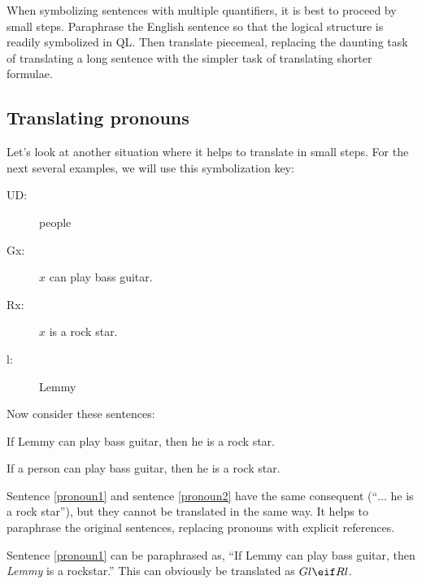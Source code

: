 When symbolizing sentences with multiple quantifiers, it is best to proceed by small steps. Paraphrase the English sentence so that the logical structure is readily symbolized in QL. Then translate piecemeal, replacing the daunting task of translating a long sentence with the simpler task of translating shorter formulae.

\subsection{Translating pronouns}

Let's look at another situation where it helps to translate in small steps. For the next several examples, we will use this symbolization key:

\begin{description}
\item[UD:] people
\item[Gx:] $x$ can play bass guitar.
\item[Rx:] $x$ is a rock star.
\item[l:] Lemmy
\end{description}

Now consider these sentences:

\begin{kormanize}
\item[\ex{pronoun1}] If Lemmy can play bass guitar, then he is a rock star.
\item[\ex{pronoun2}] If a person can play bass guitar, then he is a rock star.
\end{kormanize}


Sentence \ref{pronoun1} and sentence \ref{pronoun2} have the same consequent (``$\ldots$ he is a rock star''), but they cannot be translated in the same way. It helps to paraphrase the original sentences, replacing pronouns with explicit references.

Sentence \ref{pronoun1} can be paraphrased as, ``If Lemmy can play bass guitar, then \emph{Lemmy} is a rockstar.'' This can obviously be translated as $Gl \eif Rl$.

